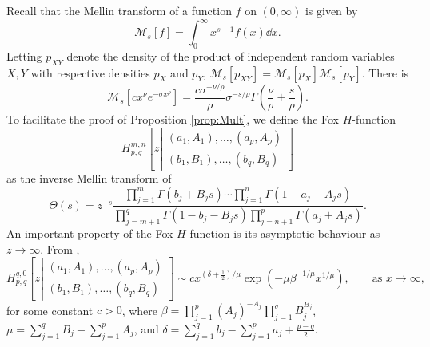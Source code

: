 \documentclass[thesis.tex]{subfiles}
\begin{document}
Recall that the Mellin transform of a function $f$ on $(0,\infty)$ is given by
\[
\mathcal{M}_s[f] = \int_0^\infty x^{s-1} f(x) \dd x.
\]
Letting $p_{XY}$ denote the density of the product of independent random variables $X,Y$ with respective densities $p_X$ and $p_Y$, $\mathcal{M}_s[p_{XY}] = \mathcal{M}_s[p_X] \mathcal{M}_s[p_Y]$. There is
\[
\mathcal{M}_s[c x^\nu e^{-\sigma x^\rho}] = \frac{c \sigma^{-\nu/\rho}}{\rho} \sigma^{-s/\rho} \Gamma\left(\frac{\nu}{\rho} + \frac{s}{\rho}\right).
\]
To facilitate the proof of Proposition \ref{prop:Mult}, we define the Fox $H$-function
\[
H_{p,q}^{m,n}\left[z\left|\substack{(a_{1},A_{1}),\dots,(a_{p},A_{p})\\
(b_{1},B_{1}),\dots,(b_{q},B_{q})
}
\right.\right]
\]
as the inverse Mellin transform of
\[
\Theta(s) = z^{-s} \frac{\prod_{j=1}^m \Gamma(b_j + B_j s) \cdots \prod_{j=1}^n \Gamma(1-a_j - A_j s)}{\prod_{j=m+1}^q \Gamma(1-b_j - B_j s) \prod_{j=n+1}^p \Gamma(a_j + A_j s)}.
\]
An important property of the Fox $H$-function is its asymptotic behaviour as $z \to \infty$. From \cite[Theorem 1.3]{mathai2009h},
\[
H_{p,q}^{q,0}\left[z\left|\substack{(a_{1},A_{1}),\dots,(a_{p},A_{p})\\
(b_{1},B_{1}),\dots,(b_{q},B_{q})}\right.\right] \sim c x^{(\delta+\frac12)/\mu} \exp(-\mu \beta^{-1/\mu} x^{1/\mu}),\qquad \mbox{as }x\to\infty,
\]
for some constant $c > 0$, where $\beta = \prod_{j=1}^p (A_j)^{-A_j} \prod_{j=1}^q B_j^{B_j}$, $\mu = \sum_{j=1}^q B_j - \sum_{j=1}^p A_j$, and $\delta = \sum_{j=1}^q b_j - \sum_{j=1}^p a_j + \frac{p-q}{2}$. 
\end{document}

